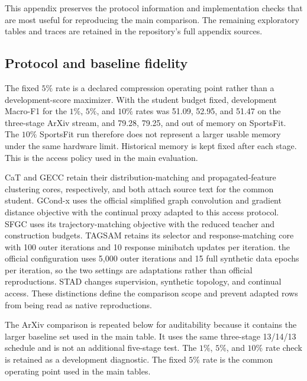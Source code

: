 \begingroup
\small
\setlength{\textfloatsep}{5pt plus 1pt minus 1pt}
\setlength{\floatsep}{4pt plus 1pt minus 1pt}
\setlength{\intextsep}{3pt plus 1pt minus 1pt}
\setlength{\abovecaptionskip}{2pt}
\setlength{\belowcaptionskip}{2pt}

This appendix preserves the protocol information and implementation checks that
are most useful for reproducing the main comparison. The remaining exploratory
tables and traces are retained in the repository's full appendix sources.

\subsection{Protocol and baseline fidelity}

The fixed $5\%$ rate is a declared compression operating point rather than a
development-score maximizer. With the student budget fixed, development
Macro-F1 for the $1\%$, $5\%$, and $10\%$ rates was 51.09, 52.95, and 51.47
on the three-stage ArXiv stream, and 79.28, 79.25, and out of memory
on SportsFit. The $10\%$ SportsFit run therefore does not represent a larger
usable memory under the same hardware limit. Historical memory is kept fixed
after each stage. This is the access policy used in the main evaluation.

CaT and GECC retain their distribution-matching and propagated-feature
clustering cores, respectively, and both attach source text for the common
student. GCond-x uses the official simplified graph convolution and gradient
distance objective with the continual proxy adapted to this access protocol.
SFGC uses its trajectory-matching objective with the reduced teacher and
construction budgets. TAGSAM retains its selector and response-matching core
with 100 outer iterations and 10 response minibatch updates per iteration.
the official configuration uses 5,000 outer iterations and 15 full synthetic
data epochs per iteration, so the two settings are adaptations rather than
official reproductions. STAD changes supervision, synthetic topology, and
continual access. These distinctions define the comparison scope and prevent
adapted rows from being read as native reproductions.

The ArXiv comparison is repeated below for auditability because it contains
the larger baseline set used in the main table. It uses the same three-stage
13/14/13 schedule and is not an additional five-stage test. The $1\%$, $5\%$,
and $10\%$ rate check is retained as a development diagnostic. The fixed
$5\%$ rate is the common operating point used in the main tables.

